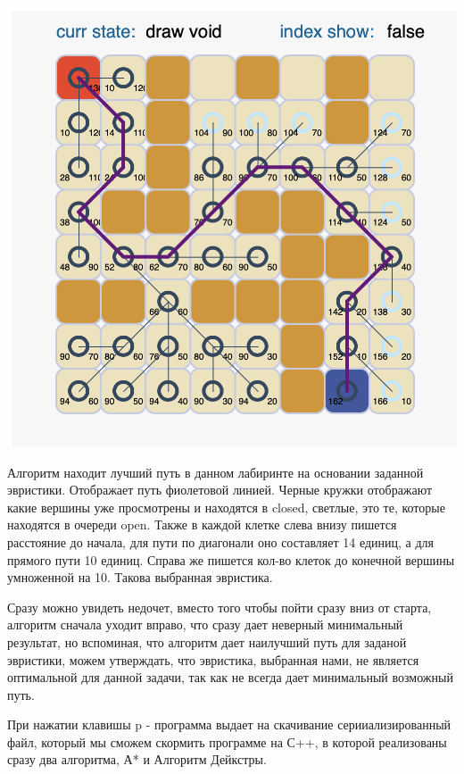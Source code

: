 \includegraphics[scale=0.75]{pictures/2.png}

Алгоритм находит лучший путь в данном лабиринте на основании заданной эвристики. Отображает путь фиолетовой линией. Черные кружки отображают какие вершины уже просмотрены и находятся в closed, светлые, это те, которые находятся в очереди open. Также в каждой клетке слева внизу пишется расстояние до начала, для пути по диагонали оно составляет 14 единиц, а для прямого пути 10 единиц. Справа же пишется кол-во клеток до конечной вершины умноженной на 10. Такова выбранная эвристика.

Сразу можно увидеть недочет, вместо того чтобы пойти сразу вниз от старта, алгоритм сначала уходит вправо, что сразу дает неверный минимальный результат, но вспоминая, что алгоритм дает наилучший путь для заданой эвристики, можем утверждать, что эвристика, выбранная нами, не является оптимальной для данной задачи, так как не всегда дает минимальный возможный путь.

При нажатии клавишы p - программа выдает на скачивание серииализированный файл, который мы сможем скормить программе на С++, в которой реализованы сразу два алгоритма, А* и Алгоритм Дейкстры.

\pagebreak

